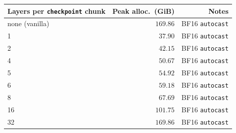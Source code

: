 \begin{tabular}{lrr}
  \toprule
  Layers per \texttt{checkpoint} chunk & Peak alloc.\ (GiB) & Notes \\
  \midrule
  none (vanilla) & $169.86$ & BF16 \texttt{autocast} \\
  1 & $37.90$ & BF16 \texttt{autocast} \\
  2 & $42.15$ & BF16 \texttt{autocast} \\
  4 & $50.67$ & BF16 \texttt{autocast} \\
  5 & $54.92$ & BF16 \texttt{autocast} \\
  6 & $59.18$ & BF16 \texttt{autocast} \\
  8 & $67.69$ & BF16 \texttt{autocast} \\
  16 & $101.75$ & BF16 \texttt{autocast} \\
  32 & $169.86$ & BF16 \texttt{autocast} \\
  \bottomrule
\end{tabular}
